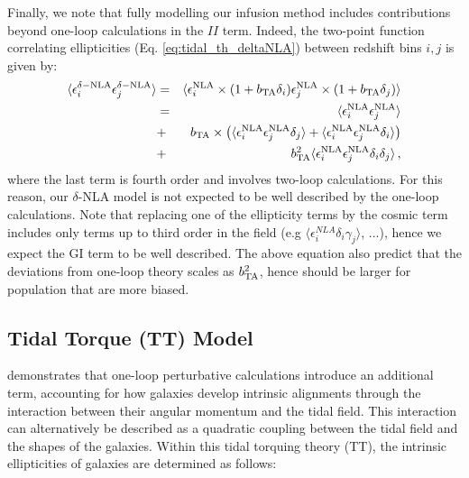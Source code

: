 Finally, we note that fully modelling our infusion method includes contributions beyond one-loop calculations in the $II$ term. Indeed, the two-point function correlating ellipticities (Eq. \ref{eq:tidal_th_deltaNLA}) between redshift bins $i,j$ is given by:
 \begin{eqnarray}
\langle \epsilon_{i}^{\delta-\rm NLA} \epsilon_{j}^{\delta-\rm NLA}\rangle &=& \langle \epsilon_{i}^{\rm NLA}\times(1 + b_{\rm TA}\delta_i) \epsilon_{j}^{\rm NLA}\times(1 + b_{\rm TA}\delta_j)\rangle\\
&=& \langle \epsilon_{i}^{\rm NLA}  \epsilon_{j}^{\rm NLA}\rangle \nonumber \\
&+& b_{\rm TA} \times \left(\langle \epsilon_{i}^{\rm NLA}  \epsilon_{j}^{\rm NLA}\delta_j  \rangle + \langle \epsilon_{i}^{\rm NLA}  \epsilon_{j}^{\rm NLA}\delta_i  \rangle \right)\nonumber\\
&+& b_{\rm TA}^2 \langle \epsilon_{i}^{\rm NLA}  \epsilon_{j}^{\rm NLA}\delta_i  \delta_j \rangle \, ,
\label{eq:2pcf_deltaNLA}
\end{eqnarray}
where the last term is fourth order and involves two-loop calculations. For this reason, our $\delta$-NLA model is not expected to be well described by the one-loop calculations. Note that replacing one of the ellipticity terms by the cosmic term includes only terms up to third order in the field (e.g $\langle \epsilon_{i}^{NLA}\delta_i \gamma_j \rangle$, ...), hence  we expect the GI term to be well described. The above equation also predict that the deviations from one-loop theory scales as $b_{\rm TA}^2$, hence should be larger for population that are more biased.


\subsection{Tidal Torque (TT) Model}
\label{subsec:IA_th_TT}

\citet{Blazek2019} demonstrates that one-loop perturbative calculations introduce an additional term, accounting for how galaxies develop intrinsic alignments through the interaction between their angular momentum and the tidal field.
This interaction can alternatively be described as a quadratic coupling between the tidal field and the shapes of the galaxies. 
Within this tidal torquing theory (TT), the intrinsic ellipticities of galaxies are determined as follows:

